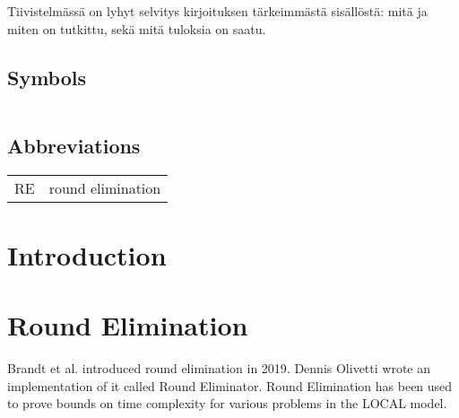 \documentclass[english, 12pt, a4paper, sci, utf8, a-1b, online]{aaltothesis}
\date{2021}
\begin{document}
\makecoverpage{}

\makecopyrightpage{}

\begin{abstractpage}[english]
  \abstracttext{}
\end{abstractpage}

\newpage


\begin{abstractpage}[finnish]
  Tiivistelmässä on lyhyt selvitys
  kirjoituksen tärkeimmästä sisällöstä: mitä ja miten on tutkittu,
  sekä mitä tuloksia on saatu. 
\end{abstractpage}

\thesistableofcontents{}



\subsection*{Symbols}

\begin{tabular}{ll}
\end{tabular}

\subsection*{Abbreviations}

\begin{tabular}{ll}
RE         & round elimination
\end{tabular}

\cleardoublepage{}
\section{Introduction}

\thispagestyle{empty}

\clearpage
\section{Round Elimination}

Brandt et al. introduced round elimination in 2019\cite{speedup}. Dennis Olivetti wrote an implementation of it called Round Eliminator\cite{RE}. Round Elimination has been used to prove bounds on time complexity for various problems in the LOCAL model\cite{tc1, tc2, tc3}.
\end{document}

